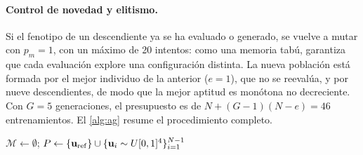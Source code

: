 \paragraph{Control de novedad y elitismo.} Si el fenotipo de un descendiente ya se ha evaluado o generado, se vuelve a mutar con $p_m=1$, con un máximo de 20 intentos: como una memoria tabú, garantiza que cada evaluación explore una configuración distinta. La nueva población está formada por el mejor individuo de la anterior ($e=1$), que no se reevalúa, y por nueve descendientes, de modo que la mejor aptitud es monótona no decreciente. Con $G=5$ generaciones, el presupuesto es de $N+(G-1)(N-e)=46$ entrenamientos. El \cref{alg:ag} resume el procedimiento completo.

\clearpage

\begin{algorithm}[htbp]
  \caption{Algoritmo genético para la optimización de hiperparámetros.}
  \label{alg:ag}
  \DontPrintSemicolon
  $\mathcal{M} \leftarrow \emptyset$; \quad $P \leftarrow \{\mathbf{u}_{\mathrm{ref}}\} \cup \{\mathbf{u}_i \sim U[0,1]^4\}_{i=1}^{N-1}$\;
\end{algorithm}


